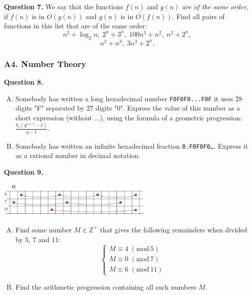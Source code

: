 \documentclass[jou]{apa6}
\begin{document}
\vspace{6pt}
{\bf Question 7.} We say that the functions $f(n)$ and $g(n)$
{\em are of the same order}, if $f(n)$ is in $O(g(n))$ and
$g(n)$ is in $O(f(n))$. Find all pairs of functions in this 
list that are of the same order:
$$n^2 + \log_2 n,\; 2^n + 3^n,\; 100n^3 + n^2,\; n^2 + 2^n,$$
$$n^2 + n^3,\;3n^3 + 2^n.$$






\subsubsection{A4. Number Theory}


{\bf Question 8.}
\begin{enumerate}[(A)]
\item
Somebody has written a long hexadecimal number
{\tt F0F0F0...F0F} \textendash{} it uses $28$ digits "F"
separated by $27$ digits "0". 
Express the value of this number as a short expression
(without $\ldots$), using
the formula of a geometric progression: $\frac{b_1(q^{n+1}-1)}{q - 1}$. 
\item 
Somebody has written an infinite hexadecimal fraction 
{\tt 0.F0F0F0\ldots}. Express it as a rational number in 
decimal notation. 
\end{enumerate}



\vspace{6pt}
{\bf Question 9.} 
\begin{center}
\includegraphics[width=3in]{midterm/sequences.png}
\end{center}

\begin{enumerate}[(A)]
\item Find some number $M \in \mathbb{Z}^{+}$ 
that gives the following remainders when divided by 
$5$, $7$ and $11$: 
$$\left\{
\begin{array}{l}
M \equiv 4\;(\text{mod}\,5)\\
M \equiv 0\;(\text{mod}\,7)\\
M \equiv 6\;(\text{mod}\,11)
\end{array} \right.$$
\item Find the arithmetic progression containing all such numbers $M$.
\end{enumerate}
\end{document}
